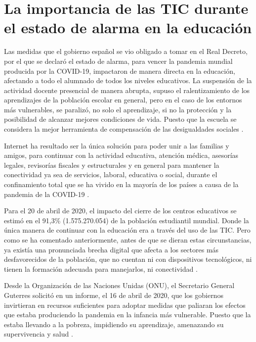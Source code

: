 \documentclass[spanish]{textolivre}
\begin{document}
\section{La importancia de las TIC durante el estado de alarma en la educación}
Las medidas que el gobierno español se vio obligado a tomar en el Real Decreto, por el que se declaró el estado de alarma, para vencer la pandemia mundial producida por la COVID-19, impactaron de manera directa en la educación, afectando a todo el alumnado de todos los niveles educativos. La suspensión de la actividad docente presencial de manera abrupta, supuso el ralentizamiento de los aprendizajes de la población escolar en general, pero en el caso de los entornos más vulnerables, se paralizó, no solo el aprendizaje, si no la protección y la posibilidad de alcanzar mejores condiciones de vida. Puesto que la escuela se considera la mejor herramienta de compensación de las desigualdades sociales \cite{espinosa2020}.

Internet ha resultado ser la única solución para poder unir a las familias y amigos, para continuar con la actividad educativa, atención médica, asesorías legales, revisorías fiscales y estructurales y en general para mantener la conectividad ya sea de servicios, laboral, educativa o social, durante el confinamiento total que se ha vivido en la mayoría de los países a causa de la pandemia de la COVID-19 \cite{lopezdaza2020}.

Para el 20 de abril de 2020, el impacto del cierre de los centros educativos se estimó en el 91,3\% (1.575.270.054) de la población estudiantil mundial. Donde la única manera de continuar con la educación era a través del uso de las TIC. Pero como se ha comentado anteriormente, antes de que se dieran estas circunstancias, ya existía una pronunciada brecha digital que afecta a los sectores más desfavorecidos de la población, que no cuentan ni con dispositivos tecnológicos, ni tienen la formación adecuada para manejarlos, ni conectividad \cite{lopezdaza2020}.

Desde la Organización de las Naciones Unidas (ONU), el Secretario General Guterres solicitó en un informe, el 16 de abril de 2020, que los gobiernos invirtieran en recursos suficientes para adoptar medidas que paliaran los efectos que estaba produciendo la pandemia en la infancia más vulnerable. Puesto que la estaba llevando a la pobreza, impidiendo su aprendizaje, amenazando su supervivencia y salud \cite{onu2020}.
\end{document}

